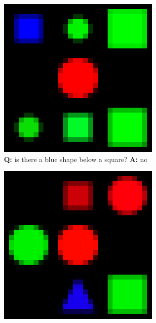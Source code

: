 \begin{figure}[ht]
\begin{subfigure}[b]{0.24\linewidth}
    \includegraphics[width=\linewidth]{images/datasets/shapes1_big.png}
    \caption{\textbf{Q:} is there a blue shape below a square? \textbf{A:} no}
     \end{subfigure}
     \hfill
     \begin{subfigure}[b]{0.24\linewidth}
    \centering
    \includegraphics[width=\linewidth]{images/datasets/shapes2_big.png}

\end{subfigure}
\end{figure}
